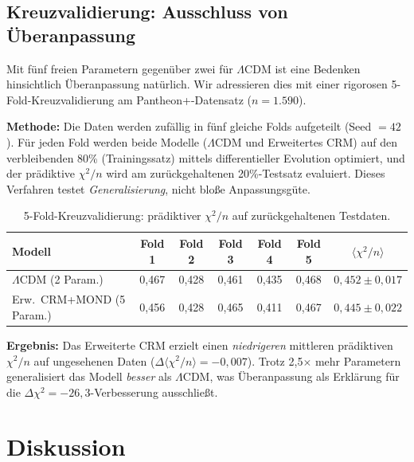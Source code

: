 \documentclass[aps,prd,twocolumn,superscriptaddress,nofootinbib]{revtex4-2}
\begin{document}
\subsection{Kreuzvalidierung: Ausschluss von \"Uberanpassung}
\label{subsec:crossval}

Mit f\"unf freien Parametern gegen\"uber zwei f\"ur $\Lambda$CDM ist eine Bedenken hinsichtlich \"Uberanpassung nat\"urlich. Wir adressieren dies mit einer rigorosen 5-Fold-Kreuzvalidierung am Pantheon+-Datensatz ($n = 1.590$).

\textbf{Methode:} Die Daten werden zuf\"allig in f\"unf gleiche Folds aufgeteilt (Seed $= 42$). F\"ur jeden Fold werden beide Modelle ($\Lambda$CDM und Erweitertes CRM) auf den verbleibenden 80\% (Trainingssatz) mittels differentieller Evolution optimiert, und der pr\"adiktive $\chi^2/n$ wird am zur\"uckgehaltenen 20\%-Testsatz evaluiert. Dieses Verfahren testet \textit{Generalisierung}, nicht bloße Anpassungsg\"ute.

\begin{table}
\centering
\caption{5-Fold-Kreuzvalidierung: pr\"adiktiver $\chi^2/n$ auf zur\"uckgehaltenen Testdaten.}
\label{tab:crossval}
\begin{tabular}{lcccccc}
\toprule
\textbf{Modell} & \textbf{Fold 1} & \textbf{Fold 2} & \textbf{Fold 3} & \textbf{Fold 4} & \textbf{Fold 5} & $\langle\chi^2/n\rangle$ \\
\midrule
$\Lambda$CDM (2 Param.) & 0,467 & 0,428 & 0,461 & 0,435 & 0,468 & $0{,}452 \pm 0{,}017$ \\
Erw.\ CRM+MOND (5 Param.) & 0,456 & 0,428 & 0,465 & 0,411 & 0,467 & $0{,}445 \pm 0{,}022$ \\
\bottomrule
\end{tabular}
\end{table}

\textbf{Ergebnis:} Das Erweiterte CRM erzielt einen \textit{niedrigeren} mittleren pr\"adiktiven $\chi^2/n$ auf ungesehenen Daten ($\Delta\langle\chi^2/n\rangle = -0{,}007$). Trotz 2{,}5$\times$ mehr Parametern generalisiert das Modell \textit{besser} als $\Lambda$CDM, was \"Uberanpassung als Erkl\"arung f\"ur die $\Delta\chi^2 = -26{,}3$-Verbesserung ausschließt.

\section{Diskussion}
\label{sec:discussion}
\end{document}

